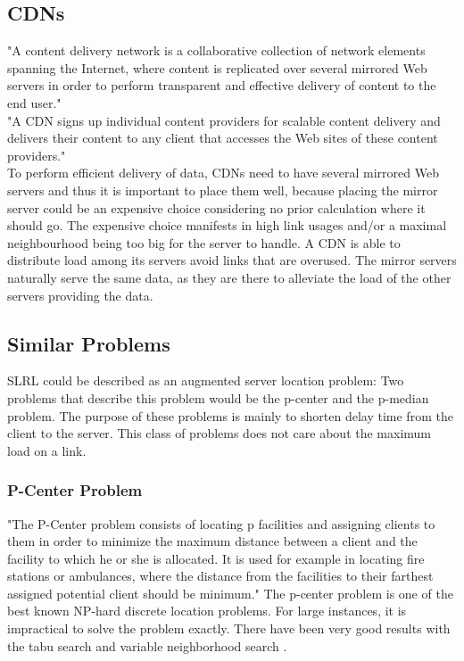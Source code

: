 \documentclass [12pt]{article}
\begin{document}
\subsection {CDNs}
"A content delivery network is a collaborative collection of network elements spanning
the Internet, where content is replicated over several mirrored Web servers in order
to perform transparent and effective delivery of content to the end user."\cite[p. 3]{Buyya:2008:CDN:1457653}\\
"A CDN signs up individual content providers for scalable content delivery and delivers
their content to any client that accesses the Web sites of these content providers."\cite[p. 193]{Rabinovich:2002:WCR:507107}\\
To perform efficient delivery of data, CDNs need to have several mirrored Web servers
and thus it is important to place them well, because placing the mirror server 
could be an expensive choice considering no prior calculation where it should go. 
The expensive choice manifests in high link usages and/or a maximal neighbourhood being
too big for the server to handle. A CDN is able to distribute load among its servers avoid
links that are overused.
The mirror servers naturally serve the same data, as they are there to alleviate the 
load of the other servers providing the data.

\subsection {Similar Problems}
SLRL could be described as an augmented server location problem: 
Two problems that describe this problem would be the p-center and the
p-median problem. The purpose of these problems is mainly to shorten delay
time from the client to the server. 
This class of problems does not care about the maximum load on a link.

\subsubsection {P-Center Problem}
"The P-Center problem consists of locating p facilities and assigning clients
to them in order to minimize the maximum distance between a client and the facility
to which he or she is allocated. It is used for example in locating fire stations or ambulances,
where the distance from the facilities 
to their farthest assigned potential client should be minimum."
The p-center problem is one of the best known NP-hard discrete location problems.
For large instances, it is impractical to solve the problem exactly.
There have been very good results with the tabu search and variable neighborhood search \cite{Mladenovic00solvingthe}
\cite{KarivHakimi1979}.
\end{document}
